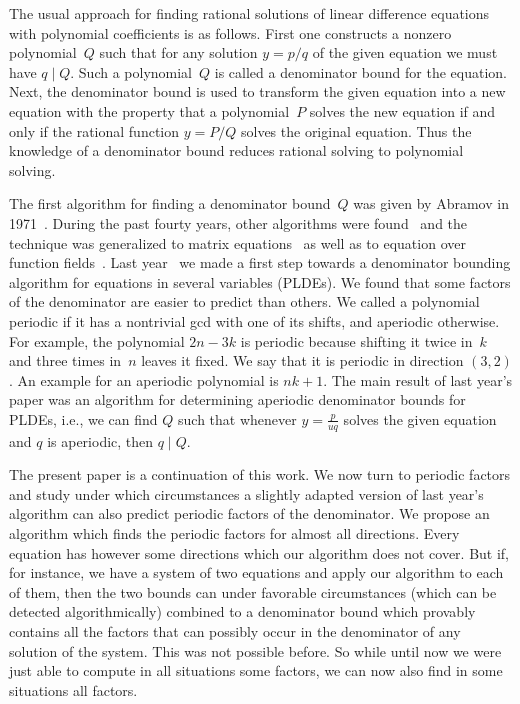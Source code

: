 \documentclass[a4paper]{sig-alternate}
\begin{document}
The usual approach for finding rational solutions of linear difference equations
with polynomial coefficients is as follows. First one constructs a nonzero polynomial~$Q$ such
that for any solution $y=p/q$ of the given equation we must have $q\mid Q$.
Such a polynomial~$Q$ is called a denominator bound for the equation.  Next, the
denominator bound is used to transform the given equation into a new equation
with the property that a polynomial~$P$ solves the new equation if and only if
the rational function $y=P/Q$ solves the original equation.  Thus the
knowledge of a denominator bound reduces rational solving to polynomial solving.

The first algorithm for finding a denominator bound~$Q$ was given by Abramov in
1971~\cite{abramov71,Abramov:89b,abramov91}. During the past fourty years, other
algorithms were found~\cite{paule95,hoeij98,bostan06,chen08b} and the technique
was generalized to matrix equations~\cite{abramov98a,barkatou99} as well as to
equation over function fields~\cite{Petkov:92,bronstein00,schneider04c}. Last
year~\cite{kauers10b} we made a first step towards a denominator bounding
algorithm for equations in several variables (PLDEs). We found that some factors
of the denominator are easier to predict than others. We called a polynomial
periodic if it has a nontrivial gcd with one of its shifts, and aperiodic
otherwise. For example, the polynomial $2n-3k$ is periodic because shifting it
twice in~$k$ and three times in~$n$ leaves it fixed.  We say that it is periodic
in direction $(3,2)$. An example for an aperiodic polynomial is $n k +1$. The
main result of last year's paper was an algorithm for determining aperiodic
denominator bounds for PLDEs, i.e., we can find $Q$ such that whenever
$y=\frac{p}{uq}$ solves the given equation and $q$ is aperiodic, then $q\mid Q$.

The present paper is a continuation of this work. We now turn to periodic
factors and study under which circumstances a slightly adapted version of last
year's algorithm can also predict periodic factors of the denominator. We
propose an algorithm which finds the periodic factors for almost all
directions. Every equation has however some directions which our algorithm does
not cover. But if, for instance, we have a system of two equations and apply our
algorithm to each of them, then the two bounds can under favorable circumstances
(which can be detected algorithmically) combined to a denominator bound which
provably contains all the factors that can possibly occur in the denominator of
any solution of the system. This was not possible before. So while until now we
were just able to compute in all situations some factors, we can now also find
in some situations all factors.
\end{document}
